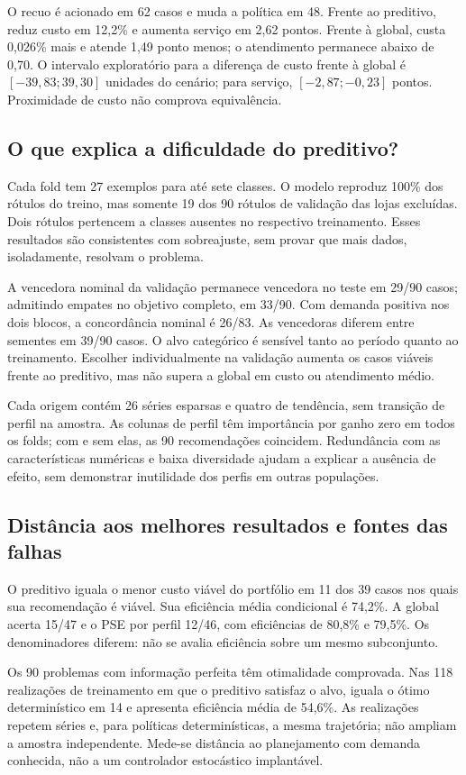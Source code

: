 O recuo é acionado em 62 casos e muda a política em 48. Frente ao preditivo, reduz custo em 12,2\% e aumenta serviço em 2,62 pontos. Frente à global, custa 0,026\% mais e atende 1,49 ponto menos; o atendimento permanece abaixo de 0,70. O intervalo exploratório para a diferença de custo frente à global é $[-39{,}83;39{,}30]$ unidades do cenário; para serviço, $[-2{,}87;-0{,}23]$ pontos. Proximidade de custo não comprova equivalência.

\subsection{O que explica a dificuldade do preditivo?}
Cada fold tem 27 exemplos para até sete classes. O modelo reproduz 100\% dos rótulos do treino, mas somente 19 dos 90 rótulos de validação das lojas excluídas. Dois rótulos pertencem a classes ausentes no respectivo treinamento. Esses resultados são consistentes com sobreajuste, sem provar que mais dados, isoladamente, resolvam o problema.

A vencedora nominal da validação permanece vencedora no teste em 29/90 casos; admitindo empates no objetivo completo, em 33/90. Com demanda positiva nos dois blocos, a concordância nominal é 26/83. As vencedoras diferem entre sementes em 39/90 casos. O alvo categórico é sensível tanto ao período quanto ao treinamento. Escolher individualmente na validação aumenta os casos viáveis frente ao preditivo, mas não supera a global em custo ou atendimento médio.

Cada origem contém 26 séries esparsas e quatro de tendência, sem transição de perfil na amostra. As colunas de perfil têm importância por ganho zero em todos os folds; com e sem elas, as 90 recomendações coincidem. Redundância com as características numéricas e baixa diversidade ajudam a explicar a ausência de efeito, sem demonstrar inutilidade dos perfis em outras populações.

\subsection{Distância aos melhores resultados e fontes das falhas}
O preditivo iguala o menor custo viável do portfólio em 11 dos 39 casos nos quais sua recomendação é viável. Sua eficiência média condicional é 74,2\%. A global acerta 15/47 e o PSE por perfil 12/46, com eficiências de 80,8\% e 79,5\%. Os denominadores diferem: não se avalia eficiência sobre um mesmo subconjunto.

Os 90 problemas com informação perfeita têm otimalidade comprovada. Nas 118 realizações de treinamento em que o preditivo satisfaz o alvo, iguala o ótimo determinístico em 14 e apresenta eficiência média de 54,6\%. As realizações repetem séries e, para políticas determinísticas, a mesma trajetória; não ampliam a amostra independente. Mede-se distância ao planejamento com demanda conhecida, não a um controlador estocástico implantável.

